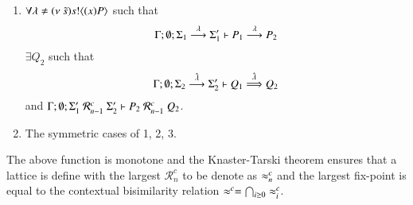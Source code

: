 \begin{definition}
\begin{itemize}
\begin{enumerate}
				\item	$\forall \lambda \not= (\nu\ \tilde{s}) s ! \langle (x)P \rangle$ such that
					\[
						\Gamma; \emptyset; \Sigma_1 \stackrel{\lambda}{\longrightarrow} \Sigma_1' \vdash P_1 \stackrel{\lambda}{\longrightarrow} P_2
					\]
					$\exists Q_2$ such that 
					\[
						\Gamma; \emptyset; \Sigma_2 \stackrel{\hat{\lambda}}{\longrightarrow} \Sigma_2' \vdash Q_1 \stackrel{\hat{\lambda}}{\Longrightarrow} Q_2
					\]
					and
					$\Gamma; \emptyset; \Sigma_1'\ \mathcal{R}^c_{n-1}\ \Sigma_2' \proves P_2\ \mathcal{R}^c_{n-1}\ Q_2$.

				\item	The symmetric cases of 1, 2, 3.
			\end{enumerate}
	\end{itemize}
	\noi The above function is monotone and the Knaster-Tarski theorem ensures that a lattice is define
	with the largest $\mathcal{R}^c_n$ to be denote as $\approx^{c}_n$ and the largest fix-point is equal to the
	contextual bisimilarity relation $\approx^{c} = \bigcap_{i \geq 0} \approx^{c}_i$.
\end{definition}


